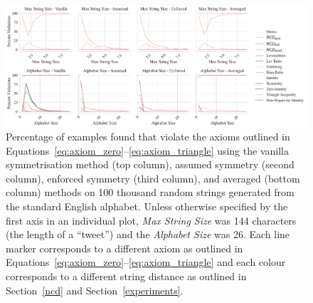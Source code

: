 \documentclass[preprint,12pt]{article}
\begin{document}
\begin{figure}[ht!]
    \centering
    \includegraphics[width=\textwidth]{images/synthetic_check.pdf}
    \caption{
    Percentage of examples found that violate the axioms outlined in Equations~\ref{eq:axiom_zero}--\ref{eq:axiom_triangle} using the vanilla symmetrisation method (top column), assumed symmetry (second column), enforced symmetry (third column), and averaged (bottom column) methods on 100 thousand random strings generated from the standard English alphabet. 
    Unless otherwise specified by the first axis in an individual plot, \textit{Max String Size} was 144 characters (the length of a ``tweet'') and the \textit{Alphabet Size} was 26. Each line marker corresponds to a different axiom as outlined in Equations~\ref{eq:axiom_zero}--\ref{eq:axiom_triangle} and each colour corresponds to a different string distance as outlined in Section~\ref{ncd} and Section~\ref{experiments}.
    }
    \label{fig:synthetic_check}
\end{figure}
\end{document}
